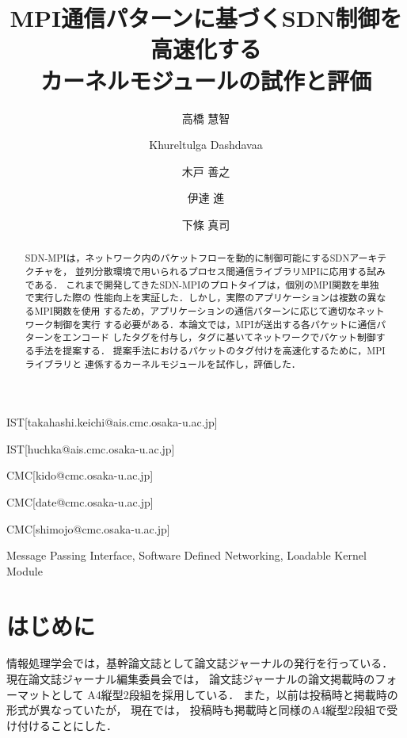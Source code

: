 \documentclass[submit,techrep,noauthor]{ipsj}
\begin{document}
\title{MPI通信パターンに基づくSDN制御を高速化する\\
    カーネルモジュールの試作と評価}



\author{高橋 慧智}{}{IST}[takahashi.keichi@ais.cmc.osaka-u.ac.jp]
\author{Khureltulga Dashdavaa}{}{IST}[huchka@ais.cmc.osaka-u.ac.jp]
\author{木戸 善之}{}{CMC}[kido@cmc.osaka-u.ac.jp]
\author{伊達 進}{}{CMC}[date@cmc.osaka-u.ac.jp]
\author{下條 真司}{}{CMC}[shimojo@cmc.osaka-u.ac.jp]

\begin{abstract}
SDN-MPIは，ネットワーク内のパケットフローを動的に制御可能にするSDNアーキテクチャを，
並列分散環境で用いられるプロセス間通信ライブラリMPIに応用する試みである．
これまで開発してきたSDN-MPIのプロトタイプは，個別のMPI関数を単独で実行した際の
性能向上を実証した．しかし，実際のアプリケーションは複数の異なるMPI関数を使用
するため，アプリケーションの通信パターンに応じて適切なネットワーク制御を実行
する必要がある．本論文では，MPIが送出する各パケットに通信パターンをエンコード
したタグを付与し，タグに基いてネットワークでパケット制御する手法を提案する．
提案手法におけるパケットのタグ付けを高速化するために，MPIライブラリと
連係するカーネルモジュールを試作し，評価した．
\end{abstract}

\begin{jkeyword}
Message Passing Interface, Software Defined Networking, Loadable Kernel Module
\end{jkeyword}

\maketitle
\section{はじめに}

情報処理学会では，基幹論文誌として論文誌ジャーナルの発行を行っている．
現在論文誌ジャーナル編集委員会では，
論文誌ジャーナルの論文掲載時のフォーマットとして
A4縦型2段組を採用している．
また，以前は投稿時と掲載時の形式が異なっていたが，
現在では，
投稿時も掲載時と同様のA4縦型2段組で受け付けることにした．


\end{document}
